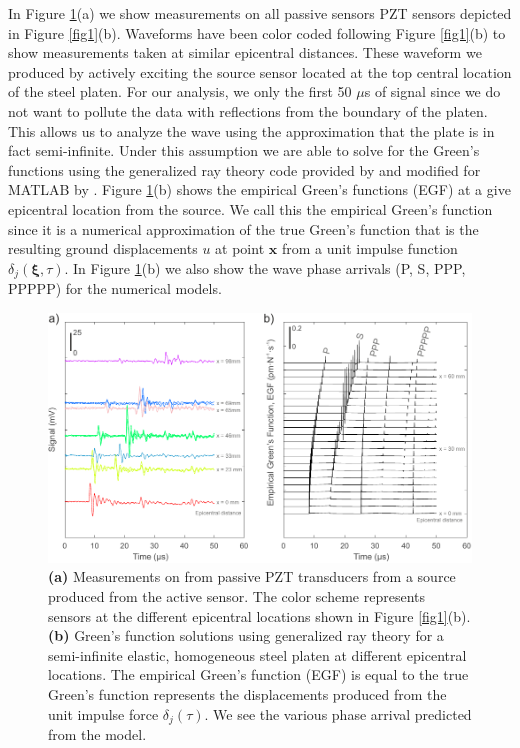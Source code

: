 \documentclass[preprint,3p, 11pt,authoryear]{elsarticle}
\begin{document}
In Figure \ref{fig3}(a) we show measurements on all passive sensors PZT sensors depicted in Figure \ref{fig1}(b).  Waveforms have been color coded following Figure \ref{fig1}(b) to show measurements taken at similar epicentral distances. These waveform we produced by actively exciting the source sensor located at the top central location of the steel platen. For our analysis, we only the first 50 $\mu$s of signal since we do not want to pollute the data with reflections from the boundary of the platen.  This allows us to analyze the wave using the approximation that the plate is in fact semi-infinite. Under this assumption we are able to solve for the Green's functions using the generalized ray theory code provided by \citet{Hsu1985} and modified for MATLAB by \citet{McLaskey2012}.  Figure \ref{fig3}(b) shows the empirical Green's functions (EGF) at a give epicentral location from the source. We call this the empirical Green's function since it is a numerical approximation of the true Green's function that is the resulting ground displacements $u$ at point $\mathbf{x}$ from a unit impulse function $\delta_{j}(\mathbf{\xi}, \tau)$. In Figure \ref{fig3}(b) we also show the wave phase arrivals (P, S, PPP, PPPPP) for the numerical models.

\begin{figure}[ht]
     	\centering
\includegraphics[scale= 1.0]{FIG3.pdf} 
\caption{\textbf{(a)} Measurements on from passive PZT transducers from a source produced from the active sensor. The color scheme represents sensors at the different epicentral locations shown in Figure \ref{fig1}(b).  \textbf{(b)} Green's function solutions using generalized ray theory for a semi-infinite elastic, homogeneous steel platen at different epicentral locations.  The empirical Green's function (EGF) is equal to the true Green's function represents the displacements produced from the unit impulse force $\delta_{j}(\tau)$. We see the various phase arrival predicted from the model.}
	\label{fig3} 
\end{figure}
\end{document}

